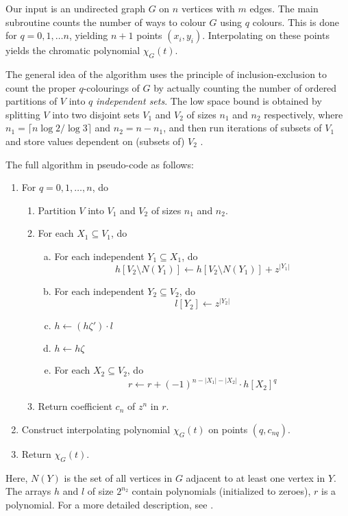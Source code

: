 \documentclass{cslthse-msc}
\begin{document}
Our input is an undirected graph $G$ on $n$ vertices with $m$ edges. The main subroutine counts the number of ways to colour $G$ using $q$ colours. This is done for $q = 0, 1, \ldots n$, yielding $n + 1$ points $(x_i, y_i)$. Interpolating on these points yields the chromatic polynomial $\chi_G(t)$.

The general idea of the algorithm uses the principle of inclusion-exclusion to count the proper $q$-colourings of $G$ by actually counting the number of ordered partitions of $V$ into $q$ \emph{independent sets}. The low space bound is obtained by splitting $V$ into two disjoint sets $V_1$ and $V_2$ of sizes $n_1$ and $n_2$ respectively, where $n_1 = \lceil n \log2 / \log3 \rceil$ and $n_2 = n - n_1$, and then run iterations of subsets of $V_1$ and store values dependent on (subsets of) $V_2$ \cite[sec. 5]{cov_pack}. 

The full algorithm in pseudo-code as follows:

\begin{enumerate}[{Step} A.]
\item \label{q} For $q = 0, 1, \ldots, n$, do
\begin{enumerate}[1.]
  \item Partition $V$ into $V_1$ and $V_2$ of sizes $n_1$ and $n_2$.
  \item \label{step1} For each $X_1 \subseteq V_1$, do
  \begin{enumerate}[a)]
  \item \label{indep1} For each independent $Y_1 \subseteq X_1$, do
\[ h[V_2 \setminus N(Y_1)] \leftarrow h[V_2 \setminus N(Y_1)] + z^{|Y_1|} \]
  \item \label{indep2} For each independent $Y_2 \subseteq V_2$, do
\[ l[Y_2] \leftarrow z^{|Y_2|} \]
  \item \label{multi} $h \leftarrow (h\zeta')\cdot l$
  \item $h \leftarrow h\zeta$
  \item \label{rstep}For each $X_2 \subseteq V_2$, do
\[ r \leftarrow r + (-1)^{n - |X_1| - |X_2|}\cdot h[X_2]^q \]
  \end{enumerate}
  \item Return coefficient $c_n$ of $z^n$ in $r$.
\end{enumerate}
\item Construct interpolating polynomial $\chi_G(t)$ on points $(q, c_{nq})$.
\item Return $\chi_G(t)$.
\end{enumerate}
Here, $N(Y)$ is the set of all vertices in $G$ adjacent to at least one vertex in $Y$. The arrays $h$ and $l$ of size $2^{n_2}$ contain polynomials (initialized to zeroes), $r$ is a polynomial. For a more detailed description, see \cite[p 9]{cov_pack}.
\end{document}
